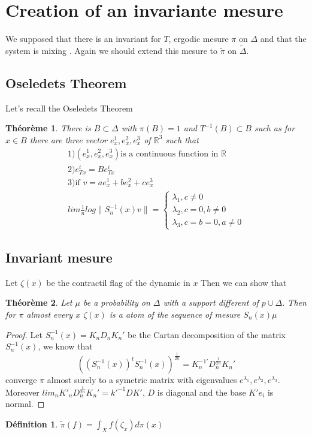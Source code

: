 \documentclass[12pt]{article}
\theoremstyle{plain}%
\newtheorem{thm}{Théorème}[section]
\theoremstyle{definition}
\newtheorem{dfnt}{Définition}[section]
\theoremstyle{remark}
\begin{document}
\section{Creation of an invariante mesure}
We supposed that there is an invariant for $T$, ergodic mesure $\pi$ on $\Delta$ and that the system is mixing %
. Again we should extend this mesure to $\tilde{\pi}$ on $\tilde{\Delta}$.\newline
\subsection{Oseledets Theorem}
Let's recall the Oseledets Theorem
\begin{thm}
There is $B \subset \Delta$ with $\pi(B)=1$ and $T^{-1}(B) \subset B$ such as for  $x\in B$ there are three vector $e^1_x,e^2_x,e^3_x$ of $\mathbb{R}^3$ such that \[
\begin{matrix}
1)(e^1_x,e^2_x,e^3_x)\text{is a continuous function in } \mathbb{R} \\
2)e^i_{Tx}=Be^i_{Tx} \\
3)\text{if }v=ae^1_x+be^2_x+ce^3_x\\
lim \frac{1}{n}log \|S_n^{-1}(x)v\|=
\left \{ \begin{matrix}
\lambda_1,c \ne 0\\
\lambda_2,c=0,b \ne 0 \\
\lambda_3,c=b=0,a\ne 0
\end{matrix}
\right .
\end{matrix}
\]
\end{thm}
\subsection{Invariant mesure}
Let $\zeta(x)$ be the contractil flag of the dynamic in $x$\newline
Then we can show that
\begin{thm}
Let $\mu$ be a probability on $\Delta$ with a support different of $p \cup \Delta$. Then for $\pi$ almost every $x$ $\zeta(x)$ is a atom of the sequence of mesure $S_n(x)\mu$
\end{thm}
\begin{proof}
Let $S_n^{-1}(x)=K_n D_n K_n'$ be the Cartan decomposition of the matrix $S_n^{-1}(x)$, we know that \[
((S_n^{-1}(x))^{t}
 S_n^{-1}(x))^{\frac{1}{2n}} =
 K_n^{-1'}
 D_n^{\frac{1}{2n}}
 K_n'
\]
converge $\pi$ almost surely to a symetric matrix with eigenvalues $e^{\lambda_1},e^{\lambda_2},e^{\lambda_3}$. Moreover $lim_n K'_n D_n^{\frac{1}{2n}} K_n'=k'^{-1}D K'$, $D$ is diagonal and the base $K' e_i$ is normal.
\end{proof}
\begin{dfnt}
$\tilde{\pi}(f)=\int_X f(\zeta_x) d \pi(x)$
\end{dfnt}
\end{document}

